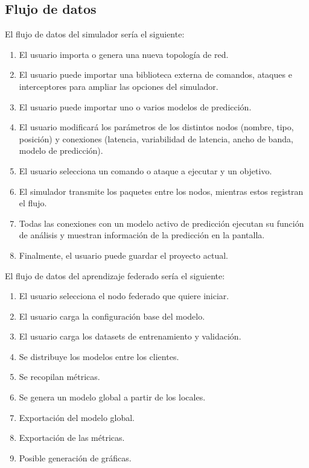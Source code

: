 \subsection{Flujo de datos}
\label{subsec:FlujoDatos}
El flujo de datos del simulador sería el siguiente:
\begin{enumerate}
    \item El usuario importa o genera una nueva topología de red.
    \item El usuario puede importar una biblioteca externa de comandos, ataques e interceptores para ampliar las opciones del simulador.
    \item El usuario puede importar uno o varios modelos de predicción.
    \item El usuario modificará los parámetros de los distintos nodos (nombre, tipo, posición) y conexiones (latencia, variabilidad de latencia, ancho de banda, modelo de predicción).
    \item El usuario selecciona un comando o ataque a ejecutar y un objetivo.
    \item El simulador transmite los paquetes entre los nodos, mientras estos registran el flujo.
    \item Todas las conexiones con un modelo activo de predicción ejecutan su función de análisis y muestran información de la predicción en la pantalla.
    \item Finalmente, el usuario puede guardar el proyecto actual.
\end{enumerate}


El flujo de datos del aprendizaje federado sería el siguiente:
\begin{enumerate}
    \item El usuario selecciona el nodo federado que quiere iniciar.
    \item El usuario carga la configuración base del modelo.
    \item El usuario carga los datasets de entrenamiento y validación.
    \item Se distribuye los modelos entre los clientes.
    \item Se recopilan métricas.
    \item Se genera un modelo global a partir de los locales.
    \item Exportación del modelo global.
    \item Exportación de las métricas.
    \item Posible generación de gráficas.
\end{enumerate}

